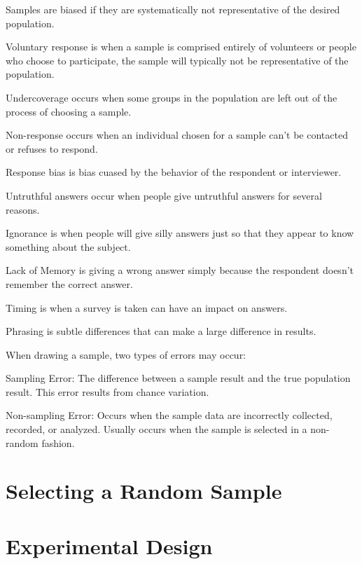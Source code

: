 \documentclass[../stats.tex]{subfiles}
\begin{document}
Samples are biased if they are systematically not representative of the desired population. 

Voluntary response is when a sample is comprised entirely of volunteers or people who choose to participate, the sample will typically not be representative of the population.

Undercoverage occurs when some groups in the population are left out of the process of choosing a sample.

Non-response occurs when an individual chosen for a sample can't be contacted or refuses to respond. 

Response bias is bias cuased by the behavior of the respondent or interviewer.

Untruthful answers occur when people give untruthful answers for several reasons.

Ignorance is when people will give silly answers just so that they appear to know something about the subject.

Lack of Memory is giving a wrong answer simply because the respondent doesn't remember the correct answer.

Timing is when a survey is taken can have an impact on answers.

Phrasing is subtle differences that can make a large difference in results. 

When drawing a sample, two types of errors may occur:

Sampling Error: The difference between a sample result and the true population result. This error results from chance variation.

Non-sampling Error: Occurs when the sample data are incorrectly collected, recorded, or analyzed. Usually occurs when the sample is selected in a non-random fashion.
\section{Selecting a Random Sample}
\section{Experimental Design}
\end{document}
